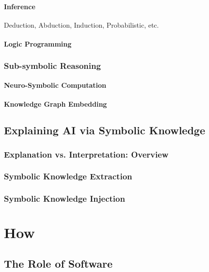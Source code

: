\documentclass[12pt,a4paper,openright,twoside]{book}
\begin{document}
\subsection{Inference}

Deduction, Abduction, Induction, Probabilistic, etc.

\subsection{Logic Programming}

\section{Sub-symbolic Reasoning}

\subsection{Neuro-Symbolic Computation}

\subsection{Knowledge Graph Embedding}

\chapter{Explaining AI via Symbolic Knowledge}

\section{Explanation vs. Interpretation: Overview}

\section{Symbolic Knowledge Extraction}

\section{Symbolic Knowledge Injection}

\part{How}
\label{part:how}

\chapter{The Role of Software}
\end{document}
